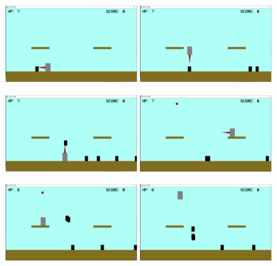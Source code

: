 \documentclass[letterpaper,11pt]{article} %
\begin{document}
	\begin{figure}[H]
		\centering
		\includegraphics[width=0.45\textwidth]{images/screencap_03}
		\hfill
		\includegraphics[width=0.45\textwidth]{images/screencap_04}
	\end{figure}

	\begin{figure}[H]
		\centering
		\includegraphics[width=0.45\textwidth]{images/screencap_05}
		\hfill
		\includegraphics[width=0.45\textwidth]{images/screencap_06}
	\end{figure}

	\begin{figure}[H]
		\centering
		\includegraphics[width=0.45\textwidth]{images/screencap_07}
		\hfill
		\includegraphics[width=0.45\textwidth]{images/screencap_08}
	\end{figure}
\end{document}
